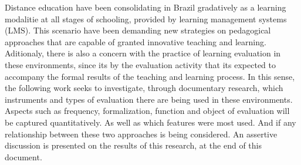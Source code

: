 Distance education have been consolidating in Brazil gradatively as a learning modalitie at all stages of schooling, provided by learning management systems (LMS). This scenario have been demanding new strategies on pedagogical approaches that are capable of granted innovative teaching and learning. Aditionaly, there is also a concern with the practice of learning evaluation in these environments, since its by the evaluation activity that its expected to accompany the formal results of the teaching and learning process. In this sense, the following work seeks to investigate, through documentary research, which instruments and types of evaluation there are being used in these environments. Aspects such as frequency, formalization, function and object of evaluation will be captured quantitatively. As well as which features were most used. And if any relationship between these two approaches is being considered. An assertive discussion is presented on the results of this research, at the end of this document.
